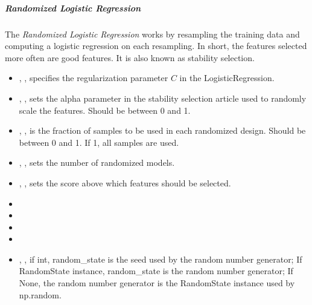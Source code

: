 \subparagraph{Randomized Logistic Regression}
\mbox{}

The \textit{Randomized Logistic Regression} works by resampling the training
data and computing a logistic regression on each resampling.
%
In short, the features selected more often are good features.
%
It is also known as stability selection.
%
\begin{itemize}
  \item {}, , specifies the
  regularization parameter $C$ in the LogisticRegression.
  \item {}, , sets
  the alpha parameter in the stability selection article used to randomly scale
  the features. 
  Should be between 0 and 1.
  \item {} , , is the
  fraction of samples to be used in each randomized design.
  Should be between 0 and 1.
  If 1, all samples are used.
  \item {} , , sets the number
  of randomized models.
  \item {} , , sets
  the score above which features should be selected.
  \item {}
  \item \verDescriptionB
  \item {}
  \item \tolDescriptionC{}
  \item {} , , if int, random\_state is the seed used by the random number
  generator; If RandomState instance, random\_state is the random
  number generator; If None, the random number generator is the RandomState
  instance used by np.random.
\end{itemize}

